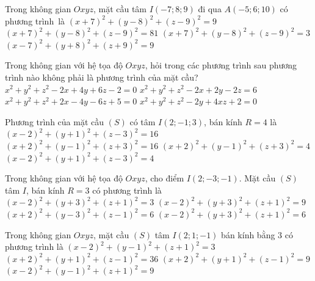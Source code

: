 \begin{ex}%
	Trong không gian $Oxyz$, mặt cầu tâm $I(-7;8;9)$ đi  qua $A(-5;6;10)$ có phương trình~là
	\choice 
		{\True  $(x+7)^2+(y-8)^2+(z-9)^2=9$}
		 {$(x+7)^2+(y-8)^2+(z-9)^2=81$}
		{$(x+7)^2+(y-8)^2+(z-9)^2=3$} 
		 {$(x-7)^2+(y+8)^2+(z+9)^2=9$}
\end{ex}

\begin{ex}%
	 Trong không gian với hệ tọa độ $Oxyz$, hỏi trong các phương trình sau phương trình nào không phải là phương trình của mặt cầu?
	\choice 
		{$x^2+y^2+z^2-2x+4y+6z-2=0$} 
		{$x^2+y^2+z^2-2x+2y-2z=6$} 
		 {$x^2+y^2+z^2+2x-4y-6z+5=0$}
		{\True $x^2+y^2+z^2-2y+4xz+2=0$} 
\end{ex}

\begin{ex}%
	Phương trình của mặt cầu $(S)$ có tâm $I(2;-1; 3)$, bán  kính $R=4$ là
	\choice 
		 {\True $(x-2)^2+(y+1)^2+(z-3)^2=16$}
		 {$(x+2)^2+(y-1)^2+(z+3)^2=16$}
		{$(x+2)^2+(y-1)^2+(z+3)^2=4$} 
		 {$(x-2)^2+(y+1)^2+(z-3)^2=4$}
\end{ex}

\begin{ex}%
	Trong không gian với hệ tọa độ $Oxyz$, cho điểm $I(2;  -3; -1)$. Mặt cầu $(S)$ tâm $I$, bán kính $R = 3$ có phương trình là
	\choice 
		{$(x-2)^2 +  (y+3)^2 + (z+1)^2 = 3$}
		{\True $(x-2)^2 + (y+3)^2 +  (z+1)^2 = 9$}
		 {$(x+2)^2 + (y-3)^2 + (z-1)^2 = 6$}
		{$(x-2)^2 +  (y+3)^2 + (z+1)^2 = 6$}
\end{ex}

\begin{ex}%
	Trong không gian $Oxyz$, mặt cầu $(S)$ tâm $I(2;1;-1)$ bán kính bằng $3$ có  phương trình là
	 \choice
		 {$(x-2)^2+(y-1)^2+(z+1)^2=3$}
		 {$(x+2)^2+(y+1)^2+(z-1)^2=36$}
		 {\True $(x+2)^2+(y+1)^2+(z-1)^2=9$}
		{$(x-2)^2+(y-1)^2+(z+1)^2=9$} 
\end{ex}

